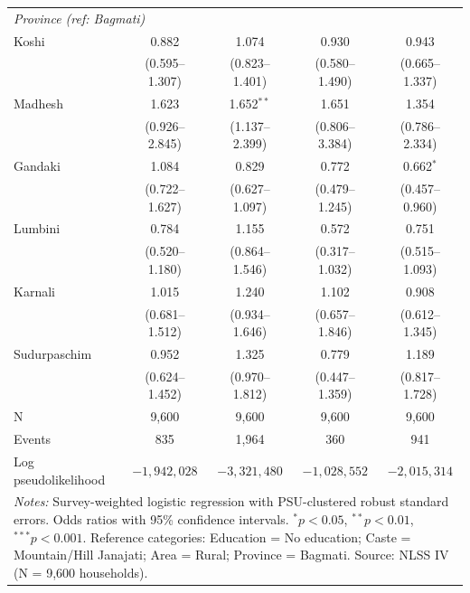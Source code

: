 \begin{table}[htbp]
\begin{tabular}{lcccc}
\multicolumn{5}{l}{\textit{Province (ref: Bagmati)}} \\
\quad Koshi & 0.882 & 1.074 & 0.930 & 0.943 \\
\quad & (0.595--1.307) & (0.823--1.401) & (0.580--1.490) & (0.665--1.337) \\
\quad Madhesh & 1.623 & 1.652$^{**}$ & 1.651 & 1.354 \\
\quad & (0.926--2.845) & (1.137--2.399) & (0.806--3.384) & (0.786--2.334) \\
\quad Gandaki & 1.084 & 0.829 & 0.772 & 0.662$^{*}$ \\
\quad & (0.722--1.627) & (0.627--1.097) & (0.479--1.245) & (0.457--0.960) \\
\quad Lumbini & 0.784 & 1.155 & 0.572 & 0.751 \\
\quad & (0.520--1.180) & (0.864--1.546) & (0.317--1.032) & (0.515--1.093) \\
\quad Karnali & 1.015 & 1.240 & 1.102 & 0.908 \\
\quad & (0.681--1.512) & (0.934--1.646) & (0.657--1.846) & (0.612--1.345) \\
\quad Sudurpaschim & 0.952 & 1.325 & 0.779 & 1.189 \\
\quad & (0.624--1.452) & (0.970--1.812) & (0.447--1.359) & (0.817--1.728) \\

\hline
N & 9,600 & 9,600 & 9,600 & 9,600 \\
Events & 835 & 1,964 & 360 & 941 \\
Log pseudolikelihood & $-1,942,028$ & $-3,321,480$ & $-1,028,552$ & $-2,015,314$ \\
\hline\hline
\multicolumn{5}{p{16cm}}{\footnotesize \textit{Notes:} Survey-weighted logistic regression with PSU-clustered robust standard errors. Odds ratios with 95\% confidence intervals. $^{*}p<0.05$, $^{**}p<0.01$, $^{***}p<0.001$. Reference categories: Education = No education; Caste = Mountain/Hill Janajati; Area = Rural; Province = Bagmati. Source: NLSS IV (N = 9,600 households).} \\
\end{tabular}
\end{table}